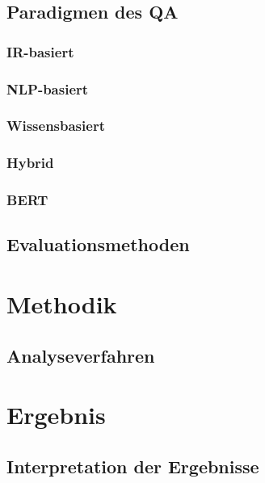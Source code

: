 \documentclass[
        ngerman,
        paper=a4,
        numbers=noendperiod,
]{scrreprt}
\begin{document}
\section{Paradigmen des QA}
\subsection{IR-basiert}
\subsection{NLP-basiert}
\subsection{Wissensbasiert}
\subsection{Hybrid}
\subsection{BERT}
\section{Evaluationsmethoden}























\chapter{Methodik}
\section{Analyseverfahren}
\chapter{Ergebnis}
\section{Interpretation der Ergebnisse}
\end{document}
